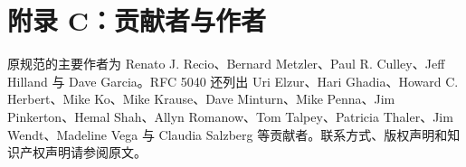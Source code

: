 \documentclass[11pt,a4paper]{article}
\begin{document}
\section{附录 C：贡献者与作者}
原规范的主要作者为 Renato J. Recio、Bernard Metzler、Paul R. Culley、Jeff Hilland 与 Dave Garcia。RFC 5040 还列出 Uri Elzur、Hari Ghadia、Howard C. Herbert、Mike Ko、Mike Krause、Dave Minturn、Mike Penna、Jim Pinkerton、Hemal Shah、Allyn Romanow、Tom Talpey、Patricia Thaler、Jim Wendt、Madeline Vega 与 Claudia Salzberg 等贡献者。联系方式、版权声明和知识产权声明请参阅原文。
\end{document}
